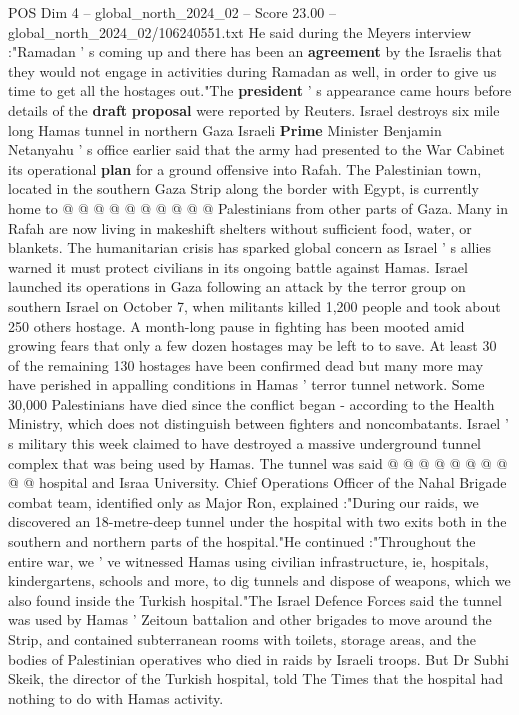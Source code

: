 \begin{textsample}{POS Dim 4 – global\_north\_2024\_02 – Score 23.00 – global\_north\_2024\_02/106240551.txt}
He said during the Meyers interview :"Ramadan ' s coming up and there has been an \textbf{agreement} by the Israelis that they would not engage in activities during Ramadan as well, in order to give us time to get all the hostages out."The \textbf{president} ' s appearance came hours before details of the \textbf{draft} \textbf{proposal} were reported by Reuters.
Israel destroys six mile long Hamas tunnel in northern Gaza Israeli \textbf{Prime} Minister Benjamin Netanyahu ' s office earlier said that the army had presented to the War Cabinet its operational \textbf{plan} for a ground offensive into Rafah.
The Palestinian town, located in the southern Gaza Strip along the border with Egypt, is currently home to @ @ @ @ @ @ @ @ @ @ Palestinians from other parts of Gaza.
Many in Rafah are now living in makeshift shelters without sufficient food, water, or blankets.
The humanitarian crisis has sparked global concern as Israel ' s allies warned it must protect civilians in its ongoing battle against Hamas.
Israel launched its operations in Gaza following an attack by the terror group on southern Israel on October 7, when militants killed 1,200 people and took about 250 others hostage.
A month-long pause in fighting has been mooted amid growing fears that only a few dozen hostages may be left to to save.
At least 30 of the remaining 130 hostages have been confirmed dead but many more may have perished in appalling conditions in Hamas ' terror tunnel network.
Some 30,000 Palestinians have died since the conflict began - according to the Health Ministry, which does not distinguish between fighters and noncombatants.
Israel ' s military this week claimed to have destroyed a massive underground tunnel complex that was being used by Hamas.
The tunnel was said @ @ @ @ @ @ @ @ @ @ hospital and Israa University.
Chief Operations Officer of the Nahal Brigade combat team, identified only as Major Ron, explained :"During our raids, we discovered an 18-metre-deep tunnel under the hospital with two exits both in the southern and northern parts of the hospital."He continued :"Throughout the entire war, we ' ve witnessed Hamas using civilian infrastructure, ie, hospitals, kindergartens, schools and more, to dig tunnels and dispose of weapons, which we also found inside the Turkish hospital."The Israel Defence Forces said the tunnel was used by Hamas ' Zeitoun battalion and other brigades to move around the Strip, and contained subterranean rooms with toilets, storage areas, and the bodies of Palestinian operatives who died in raids by Israeli troops.
But Dr Subhi Skeik, the director of the Turkish hospital, told The Times that the hospital had nothing to do with Hamas activity.

\end{textsample}
